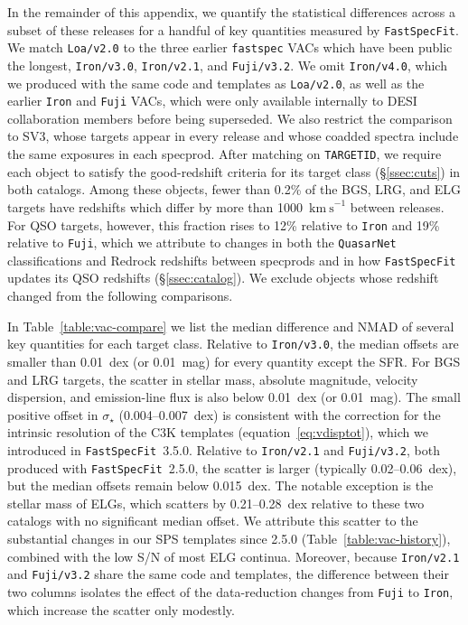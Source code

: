 \documentclass[modern,linenumbers]{aastex702}
\newcommand{\fastspecfit}{\texttt{FastSpecFit}}
\newcommand{\fastspec}{\texttt{fastspec}}
\newcommand{\kms}{\ensuremath{\mathrm{km~s}^{-1}}}
\newcommand{\vdisp}{\ensuremath{\sigma_\star}}
\begin{document}
\begin{appendix}
In the remainder of this appendix, we quantify the statistical
  differences across a subset of these releases for a handful of key
  quantities measured by \fastspecfit. We match \texttt{Loa/v2.0} to
  the three earlier \fastspec{} VACs which have been public the
  longest, \texttt{Iron/v3.0}, \texttt{Iron/v2.1}, and
  \texttt{Fuji/v3.2}. We omit \texttt{Iron/v4.0}, which we produced
  with the same code and templates as \texttt{Loa/v2.0}, as well as
  the earlier \texttt{Iron} and \texttt{Fuji} VACs, which were only
  available internally to DESI collaboration members before being
  superseded. We also restrict the comparison to SV3, whose targets
  appear in every release and whose coadded spectra include the same
  exposures in each specprod. After matching on \texttt{TARGETID}, we
  require each object to satisfy the good-redshift criteria for its
  target class (\S\ref{ssec:cuts}) in both catalogs. Among these
  objects, fewer than 0.2\% of the BGS, LRG, and ELG targets have
  redshifts which differ by more than 1000~\kms{} between
  releases. For QSO targets, however, this fraction rises to 12\%
  relative to \texttt{Iron} and 19\% relative to \texttt{Fuji}, which
  we attribute to changes in both the \texttt{QuasarNet}
  classifications and Redrock redshifts between specprods and in how
  \fastspecfit{} updates its QSO redshifts (\S\ref{ssec:catalog}). We
  exclude objects whose redshift changed from the following
  comparisons.



In Table~\ref{table:vac-compare} we list the median difference
  and NMAD of several key quantities for each target class. Relative
  to \texttt{Iron/v3.0}, the median offsets are smaller than 0.01~dex
  (or 0.01~mag) for every quantity except the SFR. For BGS and LRG
  targets, the scatter in stellar mass, absolute magnitude, velocity
  dispersion, and emission-line flux is also below 0.01~dex (or
  0.01~mag). The small positive offset in \vdisp{} (0.004--0.007~dex)
  is consistent with the correction for the intrinsic resolution of
  the C3K templates (equation~\ref{eq:vdisptot}), which we introduced
  in \fastspecfit{}~3.5.0. Relative to \texttt{Iron/v2.1} and
  \texttt{Fuji/v3.2}, both produced with \fastspecfit{}~2.5.0, the
  scatter is larger (typically 0.02--0.06~dex), but the median offsets
  remain below 0.015~dex. The notable exception is the stellar mass of
  ELGs, which scatters by 0.21--0.28~dex relative to these two catalogs
  with no significant median offset. We attribute this scatter to the
  substantial changes in our SPS templates since 2.5.0
  (Table~\ref{table:vac-history}), combined with the low
  S/N of most ELG continua. Moreover, because
  \texttt{Iron/v2.1} and \texttt{Fuji/v3.2} share the same code and
  templates, the difference between their two columns isolates the
  effect of the data-reduction changes from \texttt{Fuji} to
  \texttt{Iron}, which increase the scatter only modestly.


\end{appendix}
\end{document}
